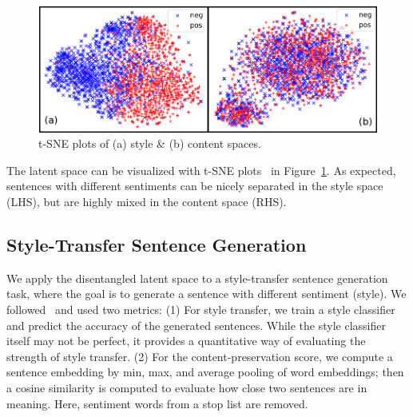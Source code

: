 \documentclass[11pt,a4paper]{article}
\begin{document}
\begin{table}[!t]
	\vspace{-.3cm}
	\centering
	\caption{Style classification accuracy.}
	\label{tab:classification}
\end{table}

\begin{figure}[!t]
	\includegraphics[width=\linewidth]{tsne-style-and-content}
	\vspace{-.9cm}
	\caption{t-SNE plots of (a) style \& (b) content spaces.}
	\label{fig:tsne}
	\vspace{-.3cm}
\end{figure}


The latent space can be visualized with t-SNE plots~\cite{maaten2008visualizing} in Figure~\ref{fig:tsne}. As expected, sentences with different sentiments can be nicely separated in the style space (LHS), but are highly mixed in the content space (RHS).


\subsection{Style-Transfer Sentence Generation}

We apply the disentangled latent space to a style-transfer sentence generation task, where the goal is to generate a sentence with different sentiment (style). We followed~ and used two metrics: (1) For style transfer, we train a style classifier and predict the accuracy of the generated sentences. While the style classifier itself may not be perfect, it provides a quantitative way of evaluating the strength of style transfer. (2) For the content-preservation score, we compute a sentence embedding by min, max, and average pooling of word embeddings; then a cosine similarity is computed to evaluate how close two sentences are in meaning. Here, sentiment words from a stop list \cite{hu2004mining} are removed.
\end{document}

